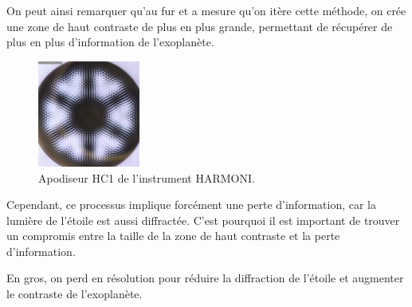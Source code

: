 On peut ainsi remarquer qu'au fur et a mesure qu'on itère cette méthode, on crée une zone de haut contraste de plus en plus grande, permettant de récupérer de plus en plus d'information de l'exoplanète.

\begin{figure}
    \centering
    \includegraphics[width=0.30\textwidth]{figures/apod_harmoni.png}
    \caption{Apodiseur HC1 de l'instrument HARMONI.}%
\end{figure}

Cependant, ce processus implique forcément une perte d'information, car la lumière de l'étoile est aussi diffractée. C'est pourquoi il est important de trouver un compromis entre la taille de la zone de haut contraste et la perte d'information.

En gros, on perd en résolution pour réduire la diffraction de l'étoile et augmenter le contraste de l'exoplanète.


